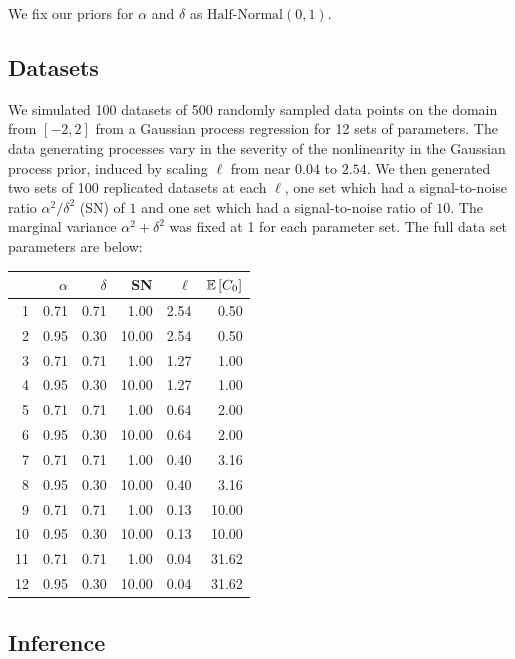 \documentclass{article}
\newcommand{\Exp}[1]{\ensuremath{\mathbb{E} \lb #1 \rb}}
\newcommand{\lb}{\ensuremath{\left[}}
\newcommand{\rb}{\ensuremath{\right]}}
\begin{document}
We fix our priors for $\alpha$ and $\delta$ as $\text{Half-Normal}(0, 1)$.

\subsection{Datasets}

We simulated 100 datasets of 500 randomly sampled data points on the domain
from $[-2, 2]$ from a Gaussian process regression for 12 sets of parameters.
The data generating processes vary in the severity of the nonlinearity in the
Gaussian process prior, induced by scaling $\ell$ from near $0.04$ to $2.54$.
We then generated two sets of 100 replicated datasets at each $\ell$, one set
which had a signal-to-noise ratio $\alpha ^ 2/ \delta ^ 2$ (SN)
of $1$ and one set which had a
signal-to-noise ratio of $10$. The marginal variance $\alpha ^ 2 + \delta ^ 2$ was fixed at 1
for each parameter set. The full data set parameters are below:

\begin{table}[ht]
\centering
\begin{tabular}{rrrrrr}
  \hline
  & $\alpha$ & $\delta$ & SN & $\ell$ & $\Exp{C_0}$ \\ 
  \hline
1 & 0.71 & 0.71 & 1.00 & 2.54 & 0.50 \\ 
  2 & 0.95 & 0.30 & 10.00 & 2.54 & 0.50 \\ 
  3 & 0.71 & 0.71 & 1.00 & 1.27 & 1.00 \\ 
  4 & 0.95 & 0.30 & 10.00 & 1.27 & 1.00 \\ 
  5 & 0.71 & 0.71 & 1.00 & 0.64 & 2.00 \\ 
  6 & 0.95 & 0.30 & 10.00 & 0.64 & 2.00 \\ 
  7 & 0.71 & 0.71 & 1.00 & 0.40 & 3.16 \\ 
  8 & 0.95 & 0.30 & 10.00 & 0.40 & 3.16 \\ 
  9 & 0.71 & 0.71 & 1.00 & 0.13 & 10.00 \\ 
  10 & 0.95 & 0.30 & 10.00 & 0.13 & 10.00 \\ 
  11 & 0.71 & 0.71 & 1.00 & 0.04 & 31.62 \\ 
  12 & 0.95 & 0.30 & 10.00 & 0.04 & 31.62 \\ 
   \hline
\end{tabular}
\end{table}

\subsection{Inference}
\end{document}

